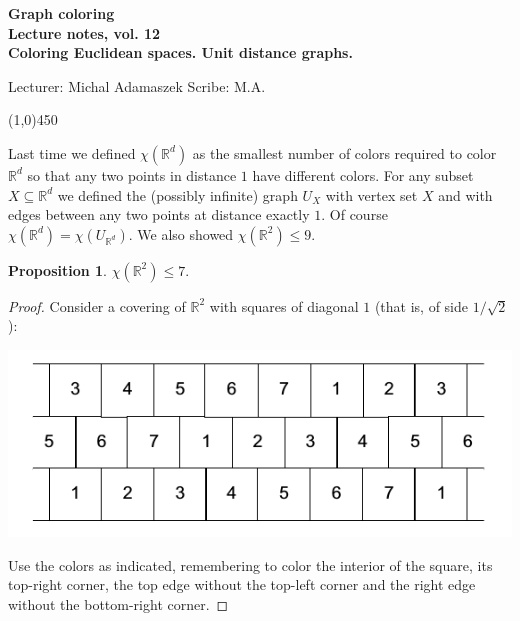 \documentclass[a4paper]{article}
\theoremstyle{plain}
\newtheorem{proposition}[lemma]{Proposition}
\theoremstyle{myremark}
\newcommand{\RR}{\mathbb{R}}
\newcommand{\LECTURENUMBER}{12}
\newcommand{\LECTURETITLE}{Coloring Euclidean spaces. Unit distance graphs.}
\newcommand{\LECTURESCRIBE}{M.A.}
\begin{document}
\thispagestyle{empty}

\begin{center}
	{\Large\bf Graph coloring}\\
	{\bf Lecture notes, vol. \LECTURENUMBER \\ 
	\LECTURETITLE}\\
\end{center}
Lecturer: Michal Adamaszek \hfill Scribe: \LECTURESCRIBE
\begin{center}
\line(1,0){450}
\end{center}

Last time we defined $\chi(\RR^d)$ as the smallest number of colors required to color $\RR^d$ so that any two points in distance $1$ have different colors. For any subset $X\subseteq \RR^d$ we defined the (possibly infinite) graph $U_X$ with vertex set $X$ and with edges between any two points at distance exactly $1$. Of course $\chi(\RR^d)=\chi(U_{\RR^d})$. We also showed $\chi(\RR^2)\leq 9$.

\begin{proposition}
$\chi(\RR^2)\leq 7.$
\end{proposition}
\begin{proof}
Consider a covering of $\RR^2$ with squares of diagonal $1$ (that is, of side $1/\sqrt{2}$):

\begin{center}\includegraphics[scale=0.4]{mf9.png}\end{center}

Use the colors as indicated, remembering to color the interior of the square, its top-right corner, the top edge without the top-left corner and the right edge without the bottom-right corner.
\end{proof}
\end{document}
